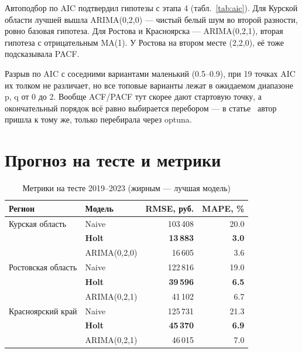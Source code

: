 \documentclass[12pt,a4paper]{report}
\begin{document}
Автоподбор по AIC подтвердил гипотезы с этапа 4 (табл.~\ref{tab:aic}). Для Курской области лучшей вышла ARIMA(0,2,0) --- чистый белый шум во второй разности, ровно базовая гипотеза. Для Ростова и Красноярска --- ARIMA(0,2,1), вторая гипотеза с отрицательным MA(1). У Ростова на втором месте (2,2,0), её тоже подсказывала PACF.

Разрыв по AIC с соседними вариантами маленький (0.5--0.9), при 19 точках AIC их толком не различает, но все топовые варианты лежат в ожидаемом диапазоне p, q от 0 до 2. Вообще ACF/PACF тут скорее дают стартовую точку, а окончательный порядок всё равно выбирается перебором --- в статье~\cite{habr-arima} автор пришла к тому же, только перебирала через optuna.

\section{Прогноз на тесте и метрики}

\begin{table}[H]
\centering
\caption{Метрики на тесте 2019--2023 (жирным --- лучшая модель)}
\label{tab:metrics}
\begin{tabular}{llrr}
\toprule
Регион & Модель & RMSE, руб. & MAPE, \% \\
\midrule
Курская область & Naive & 103\,408 & 20.0 \\
 & \textbf{Holt} & \textbf{13\,883} & \textbf{3.0} \\
 & ARIMA(0,2,0) & 16\,605 & 3.6 \\
\midrule
Ростовская область & Naive & 122\,816 & 19.0 \\
 & \textbf{Holt} & \textbf{39\,596} & \textbf{6.5} \\
 & ARIMA(0,2,1) & 41\,102 & 6.7 \\
\midrule
Красноярский край & Naive & 125\,731 & 21.3 \\
 & \textbf{Holt} & \textbf{45\,370} & \textbf{6.9} \\
 & ARIMA(0,2,1) & 46\,015 & 7.0 \\
\bottomrule
\end{tabular}
\end{table}
\end{document}
